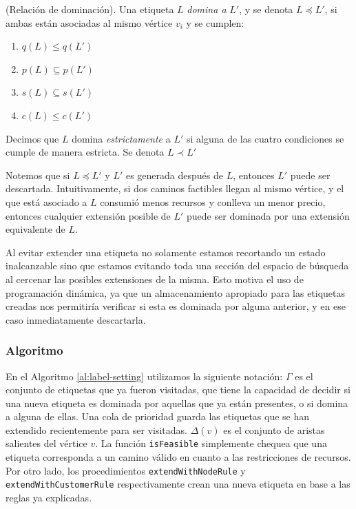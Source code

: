 \begin{definition}
\label{def:domination}
    (Relación de dominación).
    Una etiqueta $L$ \emph{domina a} $L'$, y se denota $L \preceq L'$, si ambas están asociadas al mismo vértice $v_i$ y se cumplen:
    \begin{enumerate}
        \item $q(L) \leq q(L')$
        \item $p(L) \subseteq p(L')$
        \item $s(L) \subseteq s(L')$
        \item $c(L) \leq c(L')$
    \end{enumerate}

Decimos que $L$ domina \emph{estrictamente} a $L'$ si alguna de las cuatro condiciones se cumple de manera estricta. Se denota $L \prec L'$
\end{definition}

Notemos que si $L \preceq L'$ y $L'$ es generada después de $L$, entonces $L'$ puede ser descartada. Intuitivamente, si dos caminos factibles llegan al mismo vértice, y el que está asociado a $L$ consumió menos recursos y conlleva un menor precio, entonces cualquier extensión posible de $L'$ puede ser dominada por una extensión equivalente de $L$. 

Al evitar extender una etiqueta no solamente estamos recortando un estado inalcanzable sino que estamos evitando toda una sección del espacio de búsqueda al cercenar las posibles extensiones de la misma. Esto motiva el uso de programación dinámica, ya que un almacenamiento apropiado para las etiquetas creadas nos permitiría verificar si esta es dominada por alguna anterior, y en ese caso inmediatamente descartarla.    

\subsubsection{Algoritmo}

En el Algoritmo \ref{al:label-setting} utilizamos la siguiente notación: $\Gamma$ es el conjunto de etiquetas que ya fueron visitadas, que tiene la capacidad de decidir si una nueva etiqueta es dominada por aquellas que ya están presentes, o si domina a alguna de ellas. Una cola de prioridad guarda las etiquetas que se han extendido recientemente para ser visitadas. $\Delta(v)$ es el conjunto de aristas salientes del vértice $v$. La función \texttt{isFeasible} simplemente chequea que una etiqueta corresponda a un camino válido en cuanto a las restricciones de recursos. Por otro lado, los procedimientos \texttt{extendWithNodeRule} y \texttt{extendWithCustomerRule} respectivamente crean una nueva etiqueta en base a las reglas ya explicadas.


